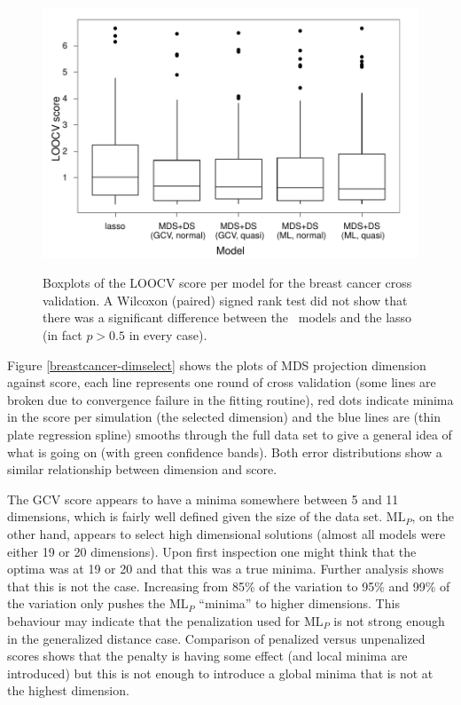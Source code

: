 \begin{figure}[t]
\centering
\includegraphics[width=6in]{gds/figs/breastcancer-cv-plot.pdf} \\
\caption{Boxplots of the LOOCV score per model for the breast cancer cross validation. A Wilcoxon (paired) signed rank test did not show that there was a significant difference between the \mdsds\ models and the lasso (in fact $p>0.5$ in every case).}
\label{breast-cancer-cv-plot}
\end{figure}

Figure \ref{breastcancer-dimselect} shows the plots of MDS projection dimension against score, each line represents one round of cross validation (some lines are broken due to convergence failure in the fitting routine), red dots indicate minima in the score per simulation (the selected dimension) and the blue lines are (thin plate regression spline) smooths through the full data set to give a general idea of what is going on (with green confidence bands). Both error distributions show a similar relationship between dimension and score.

The GCV score appears to have a minima somewhere between 5 and 11 dimensions, which is fairly well defined given the size of the data set.  $\text{ML}_P$, on the other hand, appears to select high dimensional solutions (almost all models were either 19 or 20 dimensions). Upon first inspection one might think that the optima was at 19 or 20 and that this was a true minima. Further analysis shows that this is not the case. Increasing from 85\% of the variation to 95\% and 99\% of the variation only pushes the $\text{ML}_P$ ``minima'' to higher dimensions. This behaviour may indicate that the penalization used for $\text{ML}_P$ is not strong enough in the generalized distance case. Comparison of penalized versus unpenalized scores shows that the penalty is having some effect (and local minima are introduced) but this is not enough to introduce a global minima that is not at the highest dimension.

